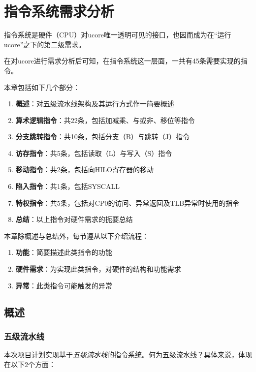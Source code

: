 \chapter{指令系统需求分析}

指令系统是硬件（CPU）对ucore唯一透明可见的接口，也因而成为在``运行ucore''之下的第二级需求。

在对ucore进行需求分析后可知，在指令系统这一层面，一共有45条需要实现的指令。

本章包括如下几个部分：

\begin{enumerate}
    \item {\bf 概述}：对五级流水线架构及其运行方式作一简要概述
    \item {\bf 算术逻辑指令}：共22条，包括加减乘、与或非、移位等指令
    \item {\bf 分支跳转指令}：共10条，包括分支（B）与跳转（J）指令
    \item {\bf 访存指令}：共5条，包括读取（L）与写入（S）指令
    \item {\bf 移动指令}：共2条，包括向HILO寄存器的移动
    \item {\bf 陷入指令}：共1条，包括SYSCALL
    \item {\bf 特权指令}：共5条，包括对CP0的访问、异常返回及TLB异常时使用的指令
    \item {\bf 总结}：以上指令对硬件需求的扼要总结
\end{enumerate}

本章除概述与总结外，每节遵从以下介绍流程：

\begin{enumerate}
    \item {\bf 功能}：简要描述此类指令的功能
    \item {\bf 硬件需求}：为实现此类指令，对硬件的结构和功能需求
    \item {\bf 异常}：此类指令可能触发的异常
\end{enumerate}

\section{概述}

\subsection{五级流水线}

本次项目计划实现基于\emph{五级流水线}的指令系统。何为五级流水线？具体来说，体现在以下2个方面：

